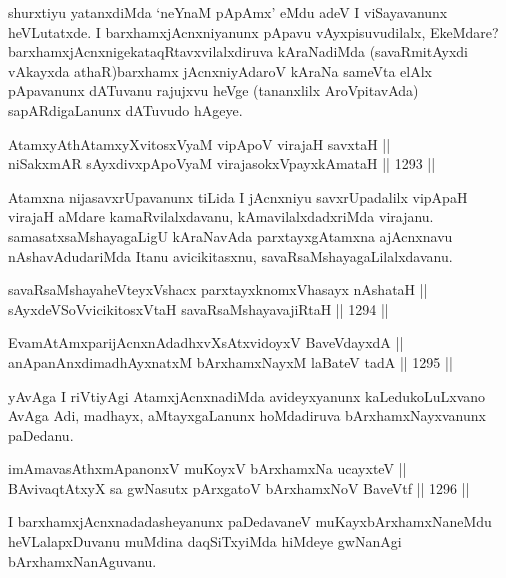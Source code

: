 \begin{artha}
shurxtiyu yatanxdiMda `neYnaM pApAmx' eMdu adeV I viSayavanunx heVLutatxde. I barxhamxjAcnxniyanunx pApavu vAyxpisuvudilalx, EkeMdare? barxhamxjAcnxnigekataqRtavxvilalxdiruva kAraNadiMda (savaRmitAyxdi vAkayxda athaR)barxhamx jAcnxniyAdaroV kAraNa sameVta elAlx pApavanunx dATuvanu rajujxvu heVge (tananxlilx AroVpitavAda) sapARdigaLanunx dATuvudo hAgeye.
\end{artha}

\begin{shl}
AtamxyAthAtamxyXvitosxV\s yaM vipApoV virajaH savxtaH || \\
niSakxmAR sAyxdivxpApoV\s yaM virajasokxV\s payxkAmataH \hfill || 1293 ||  
\end{shl}

\begin{artha}
Atamxna nijasavxrUpavanunx tiLida I jAcnxniyu savxrUpadalilx vipApaH virajaH aMdare kamaRvilalxdavanu, kAmavilalxdadxriMda virajanu. samasatxsaMshayagaLigU kAraNavAda parxtayxgAtamxna ajAcnxnavu nAshavAdudariMda Itanu avicikitasxnu, savaRsaMshayagaLilalxdavanu.
\end{artha}

\begin{shl}
savaRsaMshayaheVteyxVshacx parxtayxknomxVhasayx nAshataH || \\
sAyxdeVSoV\s vicikitosxV\s taH savaRsaMshayavajiRtaH \hfill || 1294 ||  
\end{shl}


\begin{shl}
EvamAtAmxparijAcnxnAdadhxvXsAtxvidoyxV BaveVdayxdA || \\
anApanAnxdimadhAyxnatxM bArxhamxNayxM laBateV tadA \hfill || 1295 ||  
\end{shl}

\begin{artha}
yAvAga I riVtiyAgi AtamxjAcnxnadiMda avideyxyanunx kaLedukoLuLxvano AvAga Adi, madhayx, aMtayxgaLanunx hoMdadiruva bArxhamxNayxvanunx paDedanu.
\end{artha}

\begin{shl}
imAmavasAthxmApanonxV muKoyxV bArxhamxNa ucayxteV || \\
BAvivaqtAtxyX sa gwNasutx pArxgatoV bArxhamxNoV BaveVtf \hfill || 1296 ||  
\end{shl}

\begin{artha}
I barxhamxjAcnxnadadasheyanunx paDedavaneV muKayxbArxhamxNaneMdu heVLalapxDuvanu muMdina daqSiTxyiMda hiMdeye gwNanAgi bArxhamxNanAguvanu.
\end{artha}

